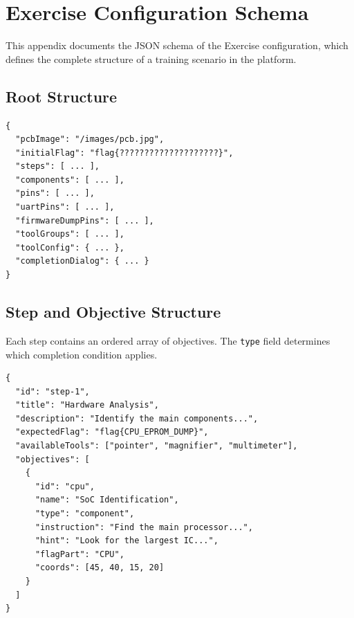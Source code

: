 \chapter{Exercise Configuration Schema}\label{app:exercise-schema}

This appendix documents the JSON schema of the Exercise configuration, which defines the complete structure of a training scenario in the \pcbctf{} platform.

\section{Root Structure}\label{sec:app-root}

\noindent\begin{minipage}{\linewidth}
\begin{lstlisting}[language={}, caption={Top-level Exercise schema.}]
{
  "pcbImage": "/images/pcb.jpg",
  "initialFlag": "flag{????????????????????}",
  "steps": [ ... ],
  "components": [ ... ],
  "pins": [ ... ],
  "uartPins": [ ... ],
  "firmwareDumpPins": [ ... ],
  "toolGroups": [ ... ],
  "toolConfig": { ... },
  "completionDialog": { ... }
}
\end{lstlisting}
\end{minipage}

\section{Step and Objective Structure}\label{sec:app-step}

Each step contains an ordered array of objectives. The \texttt{type} field determines which completion condition applies.

\noindent\begin{minipage}{\linewidth}
\begin{lstlisting}[language={}, caption={Step with objectives.}]
{
  "id": "step-1",
  "title": "Hardware Analysis",
  "description": "Identify the main components...",
  "expectedFlag": "flag{CPU_EPROM_DUMP}",
  "availableTools": ["pointer", "magnifier", "multimeter"],
  "objectives": [
    {
      "id": "cpu",
      "name": "SoC Identification",
      "type": "component",
      "instruction": "Find the main processor...",
      "hint": "Look for the largest IC...",
      "flagPart": "CPU",
      "coords": [45, 40, 15, 20]
    }
  ]
}
\end{lstlisting}
\end{minipage}

